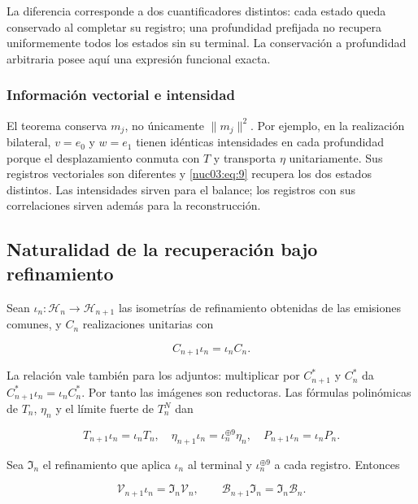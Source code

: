 La diferencia corresponde a dos cuantificadores distintos: cada estado queda conservado al completar su registro; una profundidad prefijada no recupera uniformemente todos los estados sin su terminal. La conservación a profundidad arbitraria posee aquí una expresión funcional exacta.

\subsubsection{Información vectorial e intensidad}

El teorema conserva \(m_j\), no únicamente \(\|m_j\|^2\). Por ejemplo, en la realización bilateral, \(v=e_0\) y \(w=e_1\) tienen idénticas intensidades en cada profundidad porque el desplazamiento conmuta con \(T\) y transporta \(\eta\) unitariamente. Sus registros vectoriales son diferentes y \eqref{nuc03:eq:9} recupera los dos estados distintos. Las intensidades sirven para el balance; los registros con sus correlaciones sirven además para la reconstrucción.

\subsection{Naturalidad de la recuperación bajo refinamiento}

Sean \(\iota_n:\mathcal H_n\to\mathcal H_{n+1}\) las isometrías de refinamiento obtenidas de las emisiones comunes, y \(C_n\) realizaciones unitarias con

\begin{equation}
C_{n+1}\iota_n=\iota_nC_n.
\label{nuc03:eq:12}
\end{equation}

La relación vale también para los adjuntos: multiplicar por \(C_{n+1}^*\) y \(C_n^*\) da \(C_{n+1}^*\iota_n=\iota_nC_n^*\). Por tanto las imágenes son reductoras. Las fórmulas polinómicas de \(T_n\), \(\eta_n\) y el límite fuerte de \(T_n^N\) dan

\begin{equation}
T_{n+1}\iota_n=\iota_nT_n,\quad
\eta_{n+1}\iota_n=\iota_n^{\oplus9}\eta_n,\quad
P_{n+1}\iota_n=\iota_nP_n.
\label{nuc03:eq:13}
\end{equation}

Sea \(\mathfrak I_n\) el refinamiento que aplica \(\iota_n\) al terminal y \(\iota_n^{\oplus9}\) a cada registro. Entonces

\begin{equation}
\boxed{\mathcal V_{n+1}\iota_n=\mathfrak I_n\mathcal V_n,\qquad
\mathcal B_{n+1}\mathfrak I_n=\mathfrak I_n\mathcal B_n.}
\label{nuc03:eq:14}
\end{equation}


